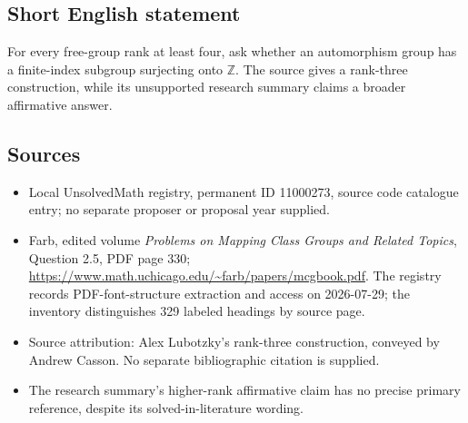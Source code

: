 \documentclass[11pt]{article}
\newcommand{\Z}{\mathbb{Z}}
\begin{document}
\subsection{Short English statement}
For every free-group rank at least four, ask whether an automorphism group has a finite-index subgroup surjecting onto $\Z$. The source gives a rank-three construction, while its unsupported research summary claims a broader affirmative answer.
\subsection{Sources}
\begin{itemize}
\item Local UnsolvedMath registry, permanent ID 11000273, source code catalogue entry; no separate proposer or proposal year supplied.
\item Farb, edited volume \emph{Problems on Mapping Class Groups and Related Topics}, Question 2.5, PDF page 330; \url{https://www.math.uchicago.edu/~farb/papers/mcgbook.pdf}. The registry records PDF-font-structure extraction and access on 2026-07-29; the inventory distinguishes 329 labeled headings by source page.
\item Source attribution: Alex Lubotzky's rank-three construction, conveyed by Andrew Casson. No separate bibliographic citation is supplied.
\item The research summary's higher-rank affirmative claim has no precise primary reference, despite its solved-in-literature wording.
\end{itemize}
\end{document}
